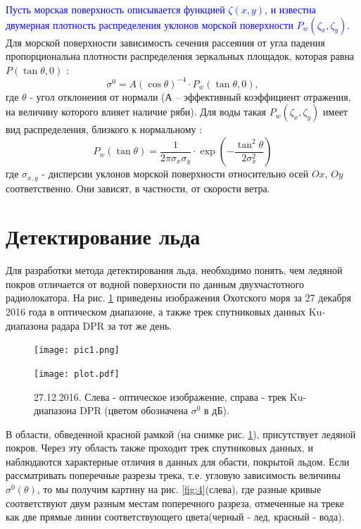 \textcolor{blue}{Пусть морская поверхность описывается функцией $\zeta(x,y)$, и известна двумерная плотность распределения уклонов морской поверхности $P_w(\zeta_x,\zeta_y)$.} Для морской поверхности зависимость сечения рассеяния от угла падения пропорциональна плотности распределения зеркальных площадок, которая равна
$P(\tan \theta, 0)$  \cite{bassfuks}:
\begin{equation}
  \sigma^0 = A (\cos \theta)^{-4} \cdot P_w(\tan \theta,0),
  \label{eq:3}
\end{equation}
где $\theta$ - угол отклонения от нормали (А – эффективный коэффициент отражения, на величину которого влияет наличие
ряби). Для воды такая $P_w(\zeta_x,\zeta_y)$ имеет вид распределения, близкого к нормальному \cite{masha}:
\begin{equation}
  P_w(\tan \theta) = \frac{1}{ 2 \pi \sigma_x \sigma_y } \cdot \exp (- \frac{\tan^2\theta}{2 \sigma^2_x})
  \label{eq:4}
\end{equation}
где $\sigma_{x,y}$ - дисперсии уклонов морской поверхности относительно осей $Ox$, $Oy$ соответственно. Они зависят, в
частности, от скорости ветра.

\section{Детектирование льда}
Для разработки метода детектирования льда, необходимо понять, чем ледяной покров отличается от водной поверхности по
данным двухчастотного радиолокатора. На рис. \ref{fig:3} приведены изображения Охотского моря за 27 декабря 2016
года в оптическом диапазоне, а также трек спутниковых данных Ku-диапазона радара DPR за тот же день.

\begin{figure}[h!]
  \centering
  \begin{minipage}{.49\linewidth}
    \texttt{[image: pic1.png]}
  \end{minipage}
  \begin{minipage}{.49\linewidth}
    \texttt{[image: plot.pdf]}
  \end{minipage}
  \caption{27.12.2016. Слева - оптическое изображение, справа - трек Ku-диапазона DPR (цветом обозначена $\sigma^0$ в дБ).}
  \label{fig:3}
\end{figure}

В области, обведенной красной рамкой (на снимке рис. \ref{fig:3}), присутствует ледяной покров. Через эту область также проходит трек
спутниковых данных, и наблюдаются характерные отличия в данных для обасти, покрытой льдом. Если рассматривать поперечные
разрезы трека, т.е. угловую зависимость величины $\sigma^0(\theta)$, то мы получим картину на рис. \ref{fig:4}(слева), где
разные кривые соответствуют двум разным местам поперечного разреза, отмеченные на треке как две прямые линии
соответствующего цвета(черный - лед, красный - вода).

